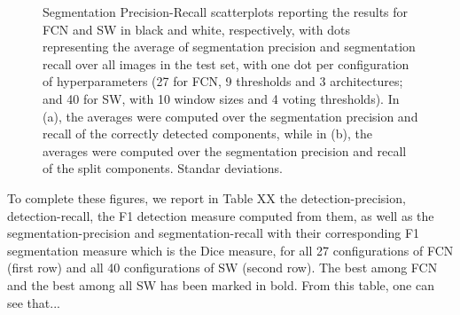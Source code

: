 \documentclass[a4paper,authoryear,review]{elsarticle}
\begin{document}
\begin{figure}%
	\centering
	\label{fig:mean-precision-recall-a}
	\qquad
	\label{fig:mean-precision-recall-b}
	\caption{Segmentation Precision-Recall scatterplots reporting the results for FCN and SW in black and white, respectively, with dots representing the average of segmentation precision and segmentation recall over all images in the test set, with one dot per configuration of hyperparameters (27 for FCN, 9 thresholds and 3 architectures;  and 40 for SW, with 10 window sizes and 4 voting thresholds). In (a), the averages were computed over the segmentation precision and recall of the correctly detected components, while in (b), the averages were computed  over the segmentation precision and recall of the split components.   Standar deviations.}%
	\label{fig:mean-precision-recall}%
\end{figure}


To complete these figures, we report in Table XX the detection-precision, detection-recall, the F1 detection measure computed from them, as well as the segmentation-precision and segmentation-recall with their corresponding F1 segmentation measure which is the Dice measure, for all 27 configurations of FCN (first row) and all 40 configurations of SW (second row). The best among FCN and the best among all SW has been marked in bold. From this table, one can see that...
\end{document}
